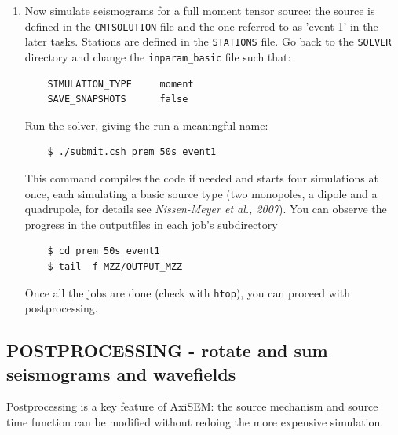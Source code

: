\documentclass{article}
\begin{document}
\begin{enumerate}
    \item Now simulate seismograms for a full moment tensor source: the source is defined
    in the \verb|CMTSOLUTION| file and the one referred to as 'event-1' in the later tasks.
    Stations are defined in the \verb|STATIONS| file. Go back to the \verb|SOLVER|
    directory and change the \verb|inparam_basic| file such that:
    \begin{verbatim}
    SIMULATION_TYPE     moment
    SAVE_SNAPSHOTS      false
    \end{verbatim}
    Run the solver, giving the run a meaningful name:
    \begin{verbatim}
    $ ./submit.csh prem_50s_event1
    \end{verbatim}
    This command compiles the code if needed and starts four simulations at once, each
    simulating a basic source type (two monopoles, a dipole and a quadrupole, for details
    see \textit{Nissen-Meyer et al., 2007}). You can observe the progress in the outputfiles in
    each job's subdirectory
    \begin{verbatim}
    $ cd prem_50s_event1
    $ tail -f MZZ/OUTPUT_MZZ
    \end{verbatim}
    Once all the jobs are done (check with \verb|htop|), you can proceed with
    postprocessing.

\end{enumerate}


\subsection{POSTPROCESSING - rotate and sum seismograms and wavefields}

Postprocessing is a key feature of AxiSEM: the source mechanism and source time function
can be modified without redoing the more expensive simulation.
\end{document}
